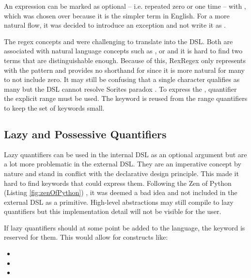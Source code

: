 An expression can be marked as optional -- i.e. repeated zero or one time -- with , which was chosen over  because it is the simpler term in English. For a more natural flow, it was decided to introduce an exception and not write it as .

The regex concepts \pattern{\placeholder *} and \pattern{\placeholder +} were challenging to translate into the DSL. Both are associated with natural language concepts such as ,  or  and it is hard to find two terms that are distinguishable enough. Because of this, RexRegex only represents \pattern{+} with the  pattern and provides no shorthand for \pattern{*} since it is more natural for many to not include zero. It may still be confusing that a single character qualifies as many but the DSL cannot resolve Sorites paradox \cite{SoritesParadox}. To express the \pattern{*}, quantifier the explicit range  must be used. The  keyword is reused from the range quantifiers to keep the set of keywords small.

\subsection{Lazy and Possessive Quantifiers}

Lazy quantifiers can be used in the internal DSL as an optional argument  but are a lot more problematic in the external DSL. They are an imperative concept by nature and stand in conflict with the declarative design principle. This made it hard to find keywords that could express them. Following the Zen of Python (Listing \ref{fig:zenOfPython}) , it was deemed a bad idea and not included in the external DSL as a primitive. High-level abstractions may still compile to lazy quantifiers but this implementation detail will not be visible for the user.

If lazy quantifiers should at some point be added to the language, the  keyword is reserved for them. This would allow for constructs like: 

\begin{itemize}
    \setlength\itemsep{0em}
    \item {}
    \item {} 
    \item {} 
\end{itemize}


